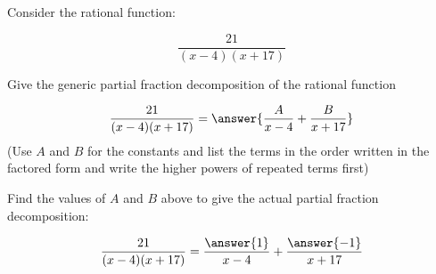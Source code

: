 \documentclass{ximera}
\author{Nicholas Hemleben}
\begin{document}
\begin{exercise}


Consider the rational function:

\[ 
\frac{21}{(x-4)(x+17)}
\]

Give the generic partial fraction decomposition of the rational function

\[
\frac{21}{(x-4)(x+17)} =
 \answer{\frac{A}{x-4} + \frac{B}{x+17}}
\]
(Use $A$ and $B$ for the constants and list the terms in the order written in the factored form and write the higher powers of repeated terms first)
\begin{exercise}
Find the values of $A$ and $B$ above to give the actual partial fraction decomposition:

\[
\frac{21}{(x-4)(x+17)} =
 \frac{\answer{1}}{x-4} + \frac{\answer{-1}}{x+17}
\]
\end{exercise}


\end{exercise}
\end{document}
